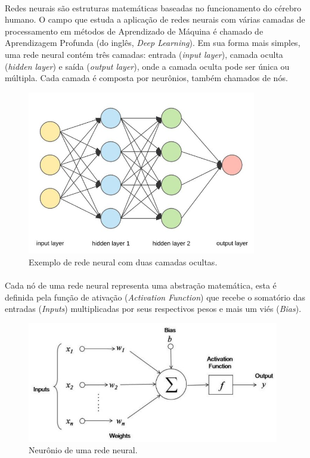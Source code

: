 \documentclass[grad,numbers]{coppe}
\begin{document}
	  \paragraph{}Redes neurais são estruturas matemáticas baseadas no funcionamento do cérebro humano. O campo que estuda a aplicação de redes neurais com várias camadas de processamento em métodos de Aprendizado de Máquina é chamado de Aprendizagem Profunda (do inglês, \textit{Deep Learning}). Em sua forma mais simples, uma rede neural contém três camadas: entrada (\textit{input layer}), camada oculta (\textit{hidden layer}) e saída (\textit{output layer}), onde a camada oculta pode ser única ou múltipla. Cada camada é composta por neurônios, também chamados de nós.
	  \begin{figure}[h]
	  	\centering
	  	\includegraphics[width=10cm]{nn1.jpg}
	  	\caption{Exemplo de rede neural com duas camadas ocultas\cite{nn1-example}.}
	  	\label{fig:nn1-fig}
	  \end{figure}
  	\paragraph{}Cada nó de uma rede neural representa uma abstração matemática, esta é definida pela função de ativação (\textit{Activation Function}) que recebe o somatório das entradas (\textit{Inputs}) multiplicadas por seus respectivos pesos e mais um viés (\textit{Bias}).
  	\begin{figure}[h]
  		\centering
  		\includegraphics[width=11cm]{nn2.jpg}
  		\caption{Neurônio de uma rede neural\cite{nn2-example}.}
  		\label{fig:nn2-fig}
  	\end{figure}
\end{document}
